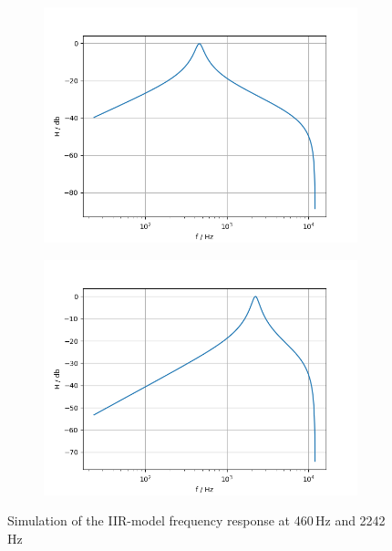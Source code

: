 \begin{figure}[!h]
    \centering
    \begin{subfigure}[c]{0.49\textwidth}
        \centering
        \includegraphics[width=\textwidth]{img/iir_bandpass460.png}
    \end{subfigure}
    \begin{subfigure}[c]{0.49\textwidth}
        \centering
        \includegraphics[width=\textwidth]{img/iir_bandpass2242.png}
    \end{subfigure}
    \caption{Simulation of the \ac{IIR}-model frequency response at 460\,Hz and 2242\,Hz}
    \label{fig:wahwah-iir}
\end{figure}

